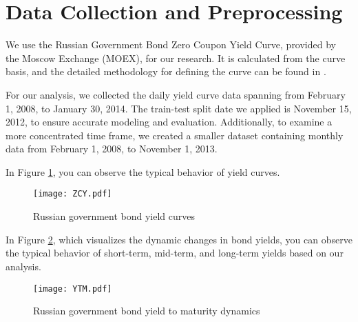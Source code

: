 \section{Data Collection and Preprocessing}
We use the Russian Government Bond Zero Coupon Yield Curve, provided by the Moscow Exchange (MOEX), for our research. It is calculated from the curve basis, and the detailed methodology for defining the curve can be found in \cite{MOEXGCURVEdocs}. 

For our analysis, we collected the daily yield curve data spanning from February 1, 2008, to January 30, 2014. The train-test split date we applied is November 15, 2012, to ensure accurate modeling and evaluation. Additionally, to examine a more concentrated time frame, we created a smaller dataset containing monthly data from February 1, 2008, to November 1, 2013.

In Figure \ref{fig:ZCYC}, you can observe the typical behavior of yield curves.
\begin{figure}[htbp]
    \texttt{[image: ZCY.pdf]}
    \caption{Russian government bond yield curves}
    \label{fig:ZCYC}
\end{figure}

In Figure \ref{fig:YTMdynamics}, which visualizes the dynamic changes in bond yields, you can observe the typical behavior of short-term, mid-term, and long-term yields based on our analysis.
\begin{figure}[htbp]
    \texttt{[image: YTM.pdf]}
    \caption{Russian government bond yield to maturity dynamics}
    \label{fig:YTMdynamics}
\end{figure}